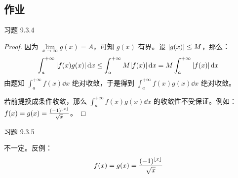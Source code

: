 \subsection{作业}

\begin{problem}
	习题 9.3.4
	\begin{proof}
		因为 $\lim\limits_{x \to \infty} g(x) = A$，可知 $g(x)$ 有界。设 $\abs{g(x)} \le M$，那么：
		$$
		\int_{a}^{+ \infty} \abs{f(x) g(x)} \dd{x} \le \int_{a}^{+ \infty } M \abs{f(x)} \dd{x} = M \int_{a}^{+ \infty} \abs{f(x)} \dd{x}
		$$
		由题知 $\int_{a}^{+ \infty} f(x) \dd{x}$ 绝对收敛，于是得到 $\int_{a}^{+ \infty} f(x) g(x) \dd{x}$ 绝对收敛。

		若前提换成条件收敛，那么 $\int_{a}^{+ \infty} f(x) g(x) \dd{x}$ 的收敛性不受保证。例如：$f(x) = g(x) = \frac{(-1)^{\left\lfloor x \right\rfloor}}{\sqrt{x}}$。
	\end{proof}
\end{problem}

\begin{problem}
	习题 9.3.5
	\begin{solution}
		不一定。反例：
		$$
		f(x) = g(x) = \frac{(-1)^{\left\lfloor x \right\rfloor}}{\sqrt{x}}
		$$
	\end{solution}
\end{problem}

